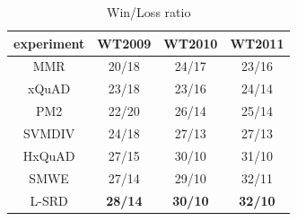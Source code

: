 \documentclass[review]{elsarticle}
\begin{document}
%

\begin{table}[!htb]
\centering
\begin{tabular}{|c|c|c|c|}
\hline
experiment & WT2009         & WT2010         & WT2011         \\
\hline
MMR        & 20/18          & 24/17          & 23/16          \\
xQuAD      & 23/18          & 23/16          & 24/14          \\
PM2        & 22/20          & 26/14          & 25/14          \\
SVMDIV     & 24/18          & 27/13          & 27/13          \\
HxQuAD     & 27/15          & 30/10          & 31/10          \\
SMWE       & 27/14          & 29/10          & 32/11          \\
L-SRD      & \textbf{28/14} & \textbf{30/10} & \textbf{32/10}  \\
\hline
\end{tabular}
\caption{Win/Loss ratio}
\label{tab3}
\end{table}
\end{document}
